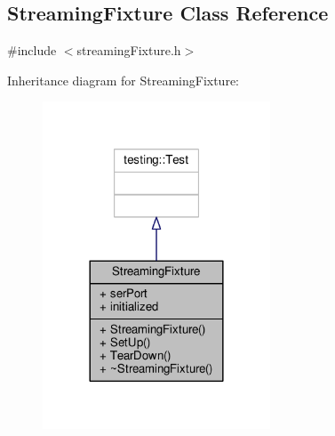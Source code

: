 \subsection{Streaming\+Fixture Class Reference}
\label{classStreamingFixture}


{\ttfamily \#include $<$streaming\+Fixture.\+h$>$}



Inheritance diagram for Streaming\+Fixture\+:
\nopagebreak
\begin{figure}[H]
\begin{center}
\leavevmode
\includegraphics[width=192pt]{d1/d48/classStreamingFixture__inherit__graph}
\end{center}
\end{figure}



